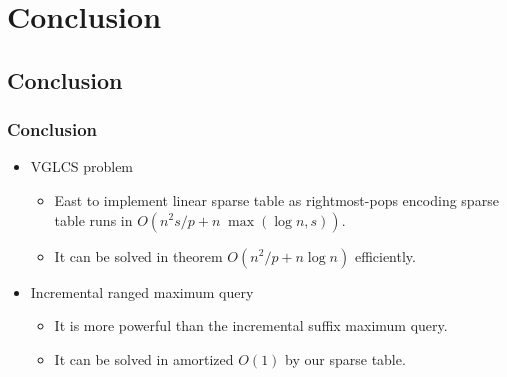\section{Conclusion}

\subsection{Conclusion}
\begin{frame}
    \frametitle{Conclusion}
    \begin{itemize}
    	\setlength\itemsep{1em}
    	\item
    		VGLCS problem
    		\begin{itemize}
    			\setlength\itemsep{1em}
    			\item 
                    East to implement linear sparse table as
                    rightmost-pops encoding sparse table runs in $O(n^2
                    s/p+n\;\max(\log n, s))$.
				\item
					It can be solved in theorem $O(n^2/p+n\log n)$
		    		efficiently.
    		\end{itemize}
    	\item
    		Incremental ranged maximum query
    		\begin{itemize}
    			\setlength\itemsep{1em}
    			\item
    				It is more powerful than the incremental suffix
					maximum query.
				\item
					It can be solved in amortized $O(1)$ by our sparse
					table.
    		\end{itemize}
    \end{itemize}
\end{frame}